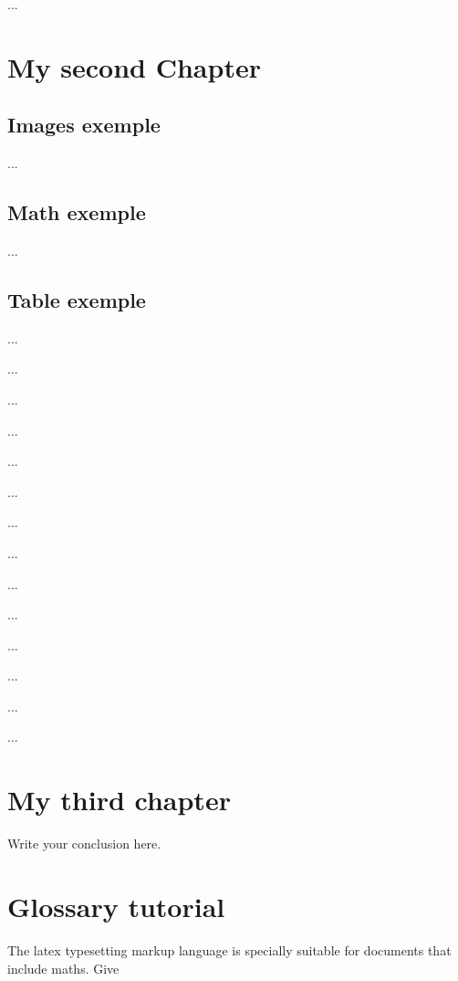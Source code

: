 \documentclass[a4paper, 12pt, oneside, times, print, NoDraft]{template/UBtemplate}
\begin{document}
...






\chapter{My second Chapter}


\section{Images exemple}

...

\section{Math exemple}

...

\section{Table exemple}

...

...

...

...

...

...

...

...

...

...

...

...

...

...



\chapter{My third chapter}

Write your conclusion here.






\chapter{Glossary tutorial}

 The \Gls{latex} typesetting markup language is specially suitable 
for documents that include \gls{maths}. Give
\end{document}
